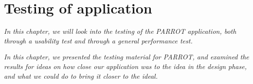 \chapter{Testing of application}
\textit{In this chapter, we will look into the testing of the PARROT application, both through a usability test and through a general performance test.}

\textit{In this chapter, we presented the testing material for PARROT, and examined the results for ideas on how close our application was to the idea in the design phase, and what we could do to bring it closer to the ideal.}